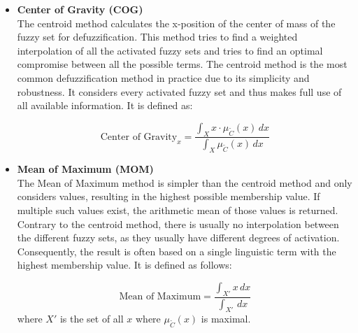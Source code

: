 \begin{itemize}
      \item \textbf{Center of Gravity (COG)} \\
            The centroid method calculates the x-position of the center of mass of the fuzzy set for defuzzification. This method tries to find a weighted interpolation of all the activated fuzzy sets and tries to find an optimal compromise between all the possible terms. The centroid method is the most common defuzzification method in practice due to its simplicity and robustness. It considers every activated fuzzy set and thus makes full use of all available information.
            It is defined as:

            \begin{equation}
                  \text{Center of Gravity}_x = \frac{\int_X x \cdot \mu_{\tilde{C}}(x) \, dx}{\int_X \mu_{\tilde{C}}(x) \, dx}
            \end{equation}

      \item \textbf{Mean of Maximum (MOM)} \\
            The Mean of Maximum method is simpler than the centroid method and only considers values, resulting in the highest possible membership value. If multiple such values exist, the arithmetic mean of those values is returned. Contrary to the centroid method, there is usually no interpolation between the different fuzzy sets, as they usually have different degrees of activation. Consequently, the result is often based on a single linguistic term with the highest membership value. It is defined as follows:

            \begin{equation}
                  \text{Mean of Maximum} = \frac{\int_{X'} x \, dx}{\int_{X'}  \, dx}
            \end{equation}
            where $X'$ is the set of all $x$ where $\mu_{\tilde{C}}(x)$ is maximal.
\end{itemize}


